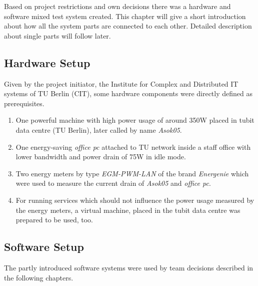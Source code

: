 Based on project restrictions and own decisions there was a hardware and software mixed test system created. This chapter will give a short introduction about how all the system parts are connected to each other. Detailed description about single parts will follow later.

\subsection{Hardware Setup}

Given by the project initiator, the Institute for Complex and Distributed IT systems of TU Berlin (CIT), some hardware components were directly defined as prerequisites.

\begin{enumerate}

\item One powerful machine with high power usage of around 350W placed in tubit data centre (TU Berlin), later called by name \textit{Asok05}.

\item One energy-saving \textit{office pc} attached to TU network inside a staff office with lower bandwidth and power drain of 75W in idle mode.

\item Two energy meters by type \textit{EGM-PWM-LAN} of the brand \textit{Energenie} which were used to measure the current drain of \textit{Asok05} and \textit{office pc}.

\item For running services which should not influence the power usage measured by the energy meters, a virtual machine, placed in the tubit data centre was prepared to be used, too.

\end{enumerate}


\subsection{Software Setup}

The partly introduced software systems were used by team decisions described in the following chapters.

